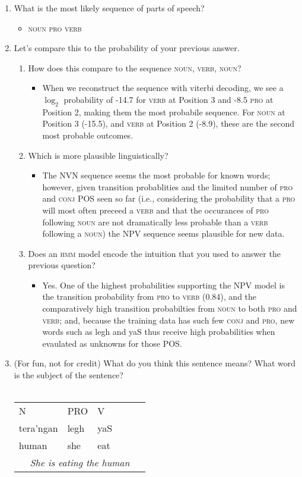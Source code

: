 \documentclass[11pt]{article}
\begin{document}
\begin{enumerate}
\item What is the most likely sequence of parts of speech?
\begin{itemize}
\item \textsc{noun} \textsc{pro} \textsc{verb}
\end{itemize}
\item Let's compare this to the probability of your previous answer.
	\begin{enumerate}
		\item How does this compare to the sequence \textsc{noun}, \textsc{verb}, \textsc{noun}? 
		\begin{itemize}
		\item When we reconstruct the sequence with viterbi decoding, we see a \(\log_2\) probability of -14.7 for \textsc{verb} at Position 3 and -8.5 \textsc{pro} at Position 2, making them the most probabile sequence. For \textsc{noun} at Position 3 (-15.5), and \textsc{verb} at Position 2 (-8.9), these are the second most probable outcomes.
		\end{itemize}
		\item Which is more plausible linguistically?
		\begin{itemize}
		\item The NVN sequence seems the most probable for known words; however, given transition probablities and the limited number of \textsc{pro} and \textsc{conj} POS seen so far (i.e., considering the probability that a \textsc{pro} will most often preceed a \textsc{verb} and that the occurances of \textsc{pro} following \textsc{noun} are not dramatically less probable than a \textsc{verb} following a \textsc{noun}) the NPV sequence seems plausible for new data.
		\end{itemize}
		\item Does an \textsc{hmm} model encode the intuition that you used to answer the previous question?
		\begin{itemize}
		\item Yes. One of the highest probabilities supporting the NPV model is the transition probability from \textsc{pro} to \textsc{verb} (0.84), and the comparatively high transition probabilties from \textsc{noun} to both \textsc{pro} and \textsc{verb}; and, because the training data has such few \textsc{conj} and \textsc{pro}, new words such as legh and yaS thus receive high probabilities when evaulated as unknowns for those POS. 
		\end{itemize}
	\end{enumerate}
\item (For fun, not for credit) What do you think this sentence means?  What word is the subject of the sentence?
\\
\\
\begin{tabular}{llllll}
  N  & PRO  & V    \\
tera'ngan   & legh & yaS   \\
human    & she   & eat   \\
\multicolumn{6}{c}{{\em She is eating the human}} \\
\end{tabular}


\end{enumerate}
\end{document}
